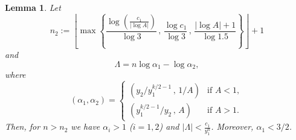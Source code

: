 \documentclass[12pt]{amsart}
\numberwithin{equation}{section}
\newtheorem{lemma}{Lemma}[section]
\theoremstyle{definition}
\theoremstyle{remark}
\begin{document}
\begin{lemma} \label{lem:Laurent_ini_conds}
Let
\begin{equation*}
n_2:=\left\lfloor\max\left\lbrace
\frac{\log\left(\frac{c_1}{|\log A|}\right)}{\log 3}\,,\,
\frac{\log c_1}{\log 3}
\,,\,\frac{|\log A|+1}{\log 1.5}
\right\rbrace\right\rfloor + 1
\end{equation*}
and
\begin{equation*}
 \Lambda =n\log\alpha_1 -\log\alpha_2,
 \end{equation*}
 where
\begin{equation*}
(\alpha_1,\alpha_2) =
\begin{cases}
  \left(y_2/y_1^{k/2-1}\,,\, 1/A\right) &
  \mbox{if $A<1$},
  \\[10pt]
  \left(y_1^{k/2-1}/y_2\,,\, A\right) &
  \mbox{if $A>1$}.
\end{cases}
\end{equation*}
Then, for $n>n_2$ we have $\alpha_i>1$  ($i=1,2$) and 
$\displaystyle{  |\Lambda | <\frac{c_1}{y_1^n}}$.
Moreover, $\alpha_1<3/2$.
\end{lemma}
%
\end{document}
